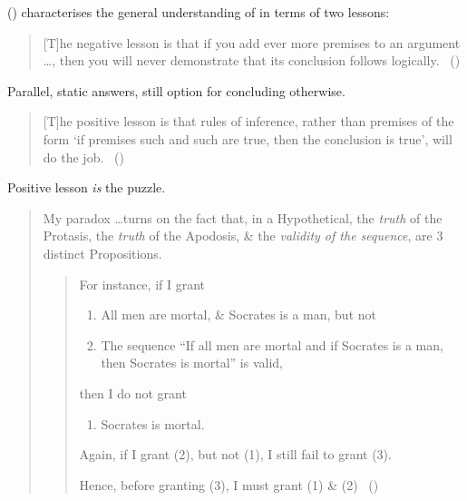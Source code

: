 \begin{note}
{    \citeauthor{Wieland:2013vf} (\citeyear{Wieland:2013vf}) characterises the general understanding of \textcite{Carroll:1895uj} in terms of two lessons:
    \begin{quote}
      [T]he negative lesson is that if you add ever more premises to an argument \dots, then you will never demonstrate that its conclusion follows logically.\newline
      \mbox{ }\hfill\mbox{(\citeyear[984]{Wieland:2013vf})}
    \end{quote}

    Parallel, static answers, still option for concluding otherwise.

    \begin{quote}
      [T]he positive lesson is that rules of inference, rather than premises of the form `if premises such and such are true, then the conclusion is true', will do the job.\newline
      \mbox{ }\hfill\mbox{(\citeyear[984]{Wieland:2013vf})}
    \end{quote}
    Positive lesson \emph{is} the puzzle.
  }

  \begin{quote}
    My paradox \dots turns on the fact that, in a Hypothetical, the \emph{truth} of the Protasis, the \emph{truth} of the Apodosis, \& the \emph{validity of the sequence}, are 3 distinct Propositions.
    \begin{quote}
      For instance, if I grant

      \begin{enumerate}[label=(\arabic*)]
      \item
        All men are mortal, \& Socrates is a man, but not
      \item
        The sequence “If all men are mortal and if Socrates is a man, then Socrates is mortal” is valid,
      \end{enumerate}

      then I do not grant

      \begin{enumerate}[label=(\arabic*), resume]
      \item Socrates is mortal.
      \end{enumerate}
      Again, if I grant (2), but not (1), I still fail to grant (3).

      Hence, before granting (3), I must grant (1) \& (2)\newline
      \mbox{ }\hfill\mbox{(\citeyear[10--11]{Carroll:2016wl})}
    \end{quote}
  \end{quote}
\end{note}

